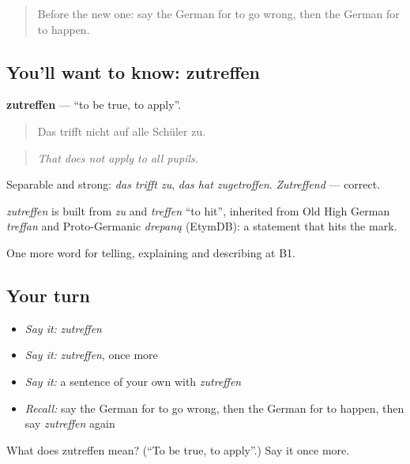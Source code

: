 \begin{quote}
Before the new one: say the German for to go wrong, then the German for to happen.
\end{quote}

\subsection*{You'll want to know: zutreffen}
\textbf{zutreffen} — \textquotedblleft{}to be true, to apply\textquotedblright{}.

\begin{quote}
Das trifft nicht auf alle Schüler zu.
\end{quote}

\begin{quote}
\emph{That does not apply to all pupils.}
\end{quote}

Separable and strong: \emph{das trifft zu}, \emph{das hat zugetroffen}. \emph{Zutreffend} — correct.

\begin{cousinweb}
\emph{zutreffen} is built from \emph{zu} and \emph{treffen} \textquotedblleft{}to hit\textquotedblright{}, inherited from Old High German \emph{treffan} and Proto-Germanic \emph{drepaną} (EtymDB): a statement that hits the mark.
\end{cousinweb}

\begin{grammarlens}[title={What you've built}]
One more word for telling, explaining and describing at B1.
\end{grammarlens}

\subsection*{Your turn}
\begin{itemize}
\raggedright
  \item \emph{Say it:} \emph{zutreffen}
  \item \emph{Say it:} \emph{zutreffen}, once more
  \item \emph{Say it:} a sentence of your own with \emph{zutreffen}
  \item \emph{Recall:} say the German for to go wrong, then the German for to happen, then say \emph{zutreffen} again
\end{itemize}

\begin{tcolorbox}[breakable,colback=teal!4,colframe=teal!35!black,title={Before you move on}]
What does zutreffen mean? (\textquotedblleft{}To be true, to apply\textquotedblright{}.) Say it once more.
\end{tcolorbox}
